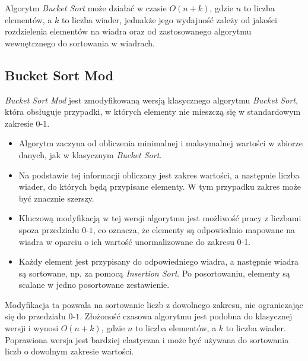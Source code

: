 \documentclass[a4paper,12pt]{article}
\begin{document}
Algorytm \textit{Bucket Sort} może działać w czasie \(O(n + k)\), gdzie \(n\) to liczba elementów, a \(k\) to liczba wiader, jednakże jego wydajność zależy od jakości rozdzielenia elementów na wiadra oraz od zastosowanego algorytmu wewnętrznego do sortowania w wiadrach.

\subsection{Bucket Sort Mod}
\textit{Bucket Sort Mod} jest zmodyfikowaną wersją klasycznego algorytmu \textit{Bucket Sort}, która obsługuje przypadki, w których elementy nie mieszczą się w standardowym zakresie \(0\)-\(1\).

\begin{itemize}
    \item Algorytm zaczyna od obliczenia minimalnej i maksymalnej wartości w zbiorze danych, jak w klasycznym \textit{Bucket Sort}.
    \item Na podstawie tej informacji obliczany jest zakres wartości, a następnie liczba wiader, do których będą przypisane elementy. W tym przypadku zakres może być znacznie szerszy.
    \item Kluczową modyfikacją w tej wersji algorytmu jest możliwość pracy z liczbami spoza przedziału \(0\)-\(1\), co oznacza, że elementy są odpowiednio mapowane na wiadra w oparciu o ich wartość unormalizowane do zakresu 0-1.
    \item Każdy element jest przypisany do odpowiedniego wiadra, a następnie wiadra są sortowane, np. za pomocą \textit{Insertion Sort}. Po posortowaniu, elementy są scalane w jedno posortowane zestawienie.
\end{itemize}

Modyfikacja ta pozwala na sortowanie liczb z dowolnego zakresu, nie ograniczając się do przedziału \(0\)-\(1\). Złożoność czasowa algorytmu jest podobna do klasycznej wersji i wynosi \(O(n + k)\), gdzie \(n\) to liczba elementów, a \(k\) to liczba wiader. Poprawiona wersja jest bardziej elastyczna i może być używana do sortowania liczb o dowolnym zakresie wartości.
\end{document}
